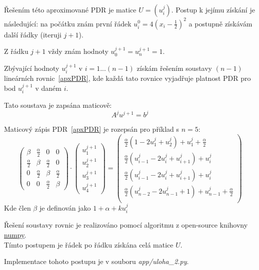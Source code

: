 \documentclass[a4paper,12pt]{article}
\begin{document}
Řešením této aproximované PDR je matice $U = \left( u_i^j \right)$.
Postup k jejímu získání je následující: na počátku znám první řádek $u_i^0 = 4(x_i - \tfrac{1}{2})^2$ a postupně získávám další řádky (iteruji $j+1$).

Z řádku $j+1$ vždy znám hodnoty $u_0^{j+1} = u_n^{j+1} = 1$.

Zbývající hodnoty $u_i^{j+1}$ v $i=1...(n-1)$ získám řešením soustavy $(n-1)$ lineárních rovnic~\ref{apxPDR}, kde každá tato rovnice vyjadřuje platnost PDR pro bod $u_i^{j+1}$ v daném $i$.

Tato soustava je zapsána maticově:
\begin{equation}
	A^j u^{j+1} = b^j
\end{equation}

Maticový zápis PDR~\ref{apxPDR} je rozepsán pro příklad s $n=5$:
\begin{equation}
\begin{pmatrix}
	\beta & \tfrac{\alpha}{2} & 0 & 0 \\
	\tfrac{\alpha}{2} & \beta & \tfrac{\alpha}{2} & 0 \\
	0 & \tfrac{\alpha}{2} & \beta & \tfrac{\alpha}{2} \\
	0 & 0 & \tfrac{\alpha}{2} & \beta
\end{pmatrix}
\cdot
\begin{pmatrix}
	u_1^{j+1} \\ u_2^{j+1} \\ u_3^{j+1} \\ u_4^{j+1}
\end{pmatrix}
=
\begin{pmatrix}
	\tfrac{\alpha}{2} \left( 1 - 2 u_1^j + u_2^j \right) + u_1^j + \tfrac{\alpha}{2} \\
	\tfrac{\alpha}{2} \left( u_{i-1}^j - 2 u_i^j + u_{i+1}^j \right) + u_i^j \\
	\tfrac{\alpha}{2} \left( u_{i-1}^j - 2 u_i^j + u_{i+1}^j \right) + u_i^j \\
	\tfrac{\alpha}{2} \left( u_{n-2}^j - 2 u_{n-1}^j + 1 \right) + u_{n-1}^j + \tfrac{\alpha}{2} \\
\end{pmatrix}
\end{equation}
Kde člen $\beta$ je definován jako $1 + \alpha + k u_i^j$

Řešení soustavy rovnic je realizováno pomocí algoritmu z open-source knihovny \textcolor{blue}{\underline{\href{https://numpy.org/}{numpy}}}.\\
Tímto postupem je řádek po řádku získána celá matice $U$.

Implementace tohoto postupu je v souboru \textit{app/uloha\_2.py}.
\end{document}

